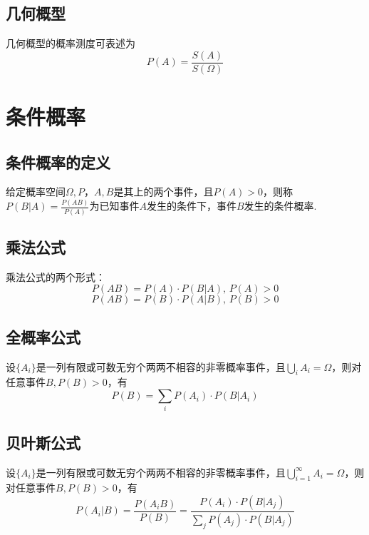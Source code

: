 \subsection{几何概型}
\tdefination[几何概型]
几何概型的概率测度可表述为
\begin{equation}
P(A)=\frac{S(A)}{S(\Omega)}
\end{equation}

\section{条件概率}
\subsection{条件概率的定义}
\tdefination[条件概率]
给定概率空间$\Omega,P$，$A,B$是其上的两个事件，且$P(A)>0$，则称$\displaystyle P(B|A)=\frac{P(AB)}{P(A)}$为已知事件$A$发生的条件下，事件$B$发生的条件概率.

\subsection{乘法公式}
\ttheorem[乘法公式]
乘法公式的两个形式：
\begin{equation}
P(AB)=P(A)\cdot P(B|A),\,P(A)>0
\end{equation}
\begin{equation}
P(AB)=P(B)\cdot P(A|B),\,P(B)>0
\end{equation}

\subsection{全概率公式}
\ttheorem[全概率公式]
设$\lbrace A_i \rbrace$是一列有限或可数无穷个两两不相容的非零概率事件，且$\bigcup\limits_{i}A_i=\Omega $，则对任意事件$B,P(B)>0$，有
\begin{equation}
P(B)=\sum\limits_{i}P(A_i)\cdot P(B|A_i)
\end{equation}

\subsection{贝叶斯公式}
\ttheorem[贝叶斯公式]
设$\lbrace A_i \rbrace$是一列有限或可数无穷个两两不相容的非零概率事件，且$\bigcup_{i=1}^{\infty}A_i=\Omega $，则对任意事件$B,P(B)>0$，有
\begin{equation}
P(A_i|B)=\frac{P(A_iB)}{P(B)}=\frac{P(A_i)\cdot P(B|A_j)}{\sum\limits_{j}P(A_j)\cdot P(B|A_j)}
\end{equation}

